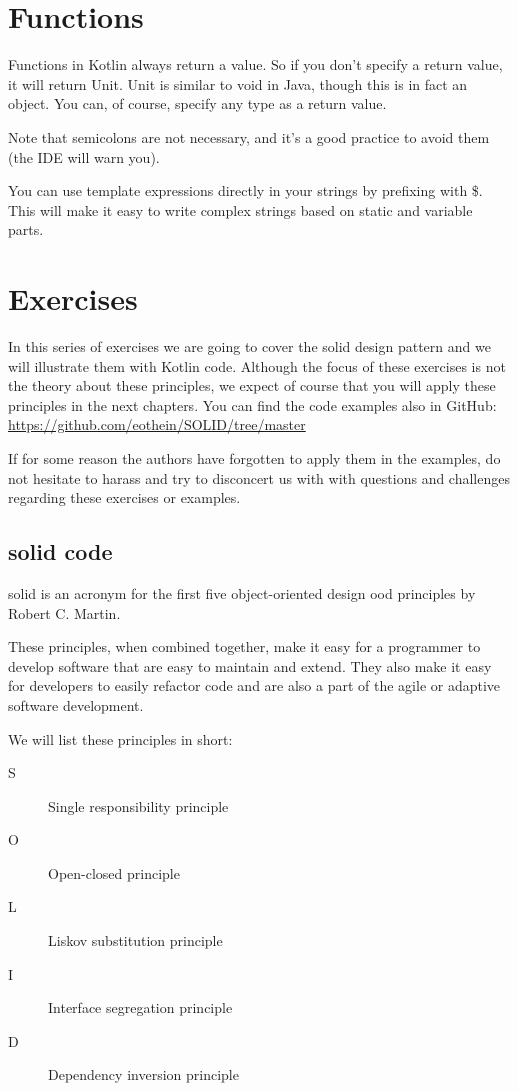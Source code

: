 \section{Functions}
Functions in Kotlin always return a value.
So if you don’t specify a return value, it will return Unit.
Unit is similar to void in Java, though this is in fact an object.
You can, of course, specify any type as a return value.

Note that semicolons are not  necessary, and it’s a good practice to avoid them (the IDE will warn you).

You can use template expressions directly in your strings by prefixing with \$.
This will make it easy to write complex strings based on static and variable parts.

\section{Exercises }
In this series of exercises we are going to cover the \gls{solid} design pattern and we will illustrate them with Kotlin code.
Although the focus of these exercises is not the theory about these principles, we expect of course that you will apply these principles in the next chapters.
You can find the code examples also in GitHub: \url{https://github.com/eothein/SOLID/tree/master}

If for some reason the authors  have forgotten to apply them in the examples, do not hesitate to  harass and try to disconcert us with with questions and challenges regarding these exercises or examples.


\subsection{\gls{solid} code}
\gls{solid} is an acronym for the first five object-oriented design \gls{ood} principles by Robert C. Martin.

These principles, when combined together, make it easy for a programmer to develop software that are easy to maintain and extend.
They also make it easy for developers to easily refactor code and are also a part of the agile or adaptive software development.

We will list these principles in short:

\begin{description}
	\item[S] Single responsibility principle
	\item[O] Open-closed principle
	\item[L] Liskov substitution principle
	\item[I] Interface segregation principle
	\item[D] Dependency inversion principle
\end{description}

